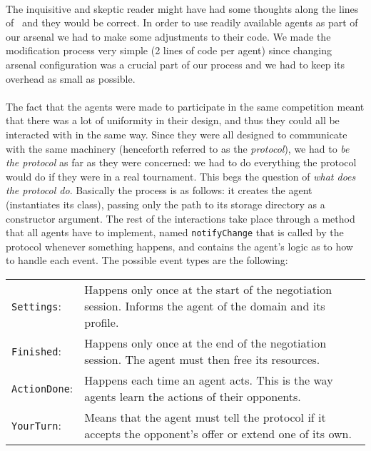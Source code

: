\paragraph*{}
The inquisitive and skeptic reader might have had some thoughts along the lines of  \textendash \ and they would be correct. In order to use readily available agents as part of our arsenal we had to make some adjustments to their code. We made the modification process very simple (2 lines of code per agent) since changing arsenal configuration was a crucial part of our process and we had to keep its overhead as small as possible.

\paragraph*{}
The fact that the agents were made to participate in the same competition meant that there was a lot of uniformity in their design, and thus they could all be interacted with in the same way. Since they were all designed to communicate with the same machinery (henceforth referred to as the \emph{protocol}), we had to \emph{be the protocol} as far as they were concerned: we had to do everything the protocol would do if they were in a real tournament. This begs the question of \emph{what does the protocol do}. Basically the process is as follows: it creates the agent (instantiates its class), passing only the path to its storage directory as a constructor argument. The rest of the interactions take place through a method that all agents have to implement, named \texttt{notifyChange} that is called by the protocol whenever something happens, and contains the agent's logic as to how to handle each event. The possible event types are the following:
\renewcommand{\arraystretch}{1.5} %
\begin{longtable}{l p{290pt}}

    \texttt{Settings}: & Happens only once at the start of the negotiation session. Informs the agent of the domain and its profile. \\

    \texttt{Finished}: & Happens only once at the end of the negotiation session. The agent must then free its resources. \\
    
    \texttt{ActionDone}: & Happens each time an agent acts. This is the way agents learn the actions of their opponents. \\
    
    \texttt{YourTurn}:	& Means that the agent must tell the protocol if it accepts the opponent's offer or extend one of its own. \\

\end{longtable}

